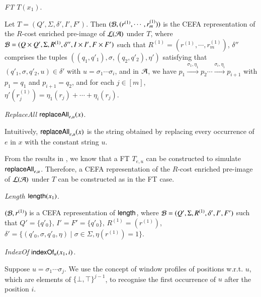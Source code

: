 \smallskip
\noindent \emph{FT $T(x_1)$}.

\smallskip

Let $T= (Q', \Sigma, \delta', I', F')$. Then $(\mathcal{B}, (r^{(1)}, \cdots, r^{(1)}_m))$ is the CEFA representation of the $R$-cost enriched pre-image of $\mathcal{L}(\mathcal{A})$ under $T$, where $ \mathcal{B}= (Q \times Q', \Sigma, R^{(1)}, \delta'', I \times I', F \times F')$ such that $R^{(1)}  = (r^{(1)}, \cdots, r^{(1)}_m)$, $\delta''$ comprises the tuples $((q_1, q'_1), \sigma, (q_2, q'_2), \eta')$ satisfying that $(q'_1, \sigma, q'_2, u) \in \delta'$ with $u = \sigma_1 \cdots \sigma_i$, and in $\mathcal{A}$, we have $p_1 \xrightarrow{\sigma_1, \eta_1} p_2 \cdots \xrightarrow{\sigma_i, \eta_i} p_{i+1}$ with $p_1 = q_1$ and $p_{i+1}= q_2$, and for each $j \in [m]$,  $\eta'(r^{(1)}_j) = \eta_1(r_j) + \cdots + \eta_i(r_j)$.
%

\smallskip 

\noindent \emph{ReplaceAll $\mathsf{replaceAll}_{e,u}(x)$}.

\smallskip

Intuitively, $\mathsf{replaceAll}_{e,u}(x)$ is the string obtained by replacing every occurrence of $e$ in $x$ with the constant string $u$.

From the results in \cite{CCH+18}, we know that  a FT $T_{e,u}$ can be constructed to simulate $\mathsf{replaceAll}_{e,u}$. 
Therefore, a CEFA representation of the $R$-cost enriched pre-image of $\mathcal{L}(\mathcal{A})$ under $T$ can be constructed as in the FT case.
% 

\smallskip 

\noindent \emph{Length $\mathsf{length}(x_1)$}.

\smallskip

$(\mathcal{B}, r^{(1)})$ is a CEFA representation of $\mathsf{length}$, where $\mathcal{B} = (Q', \Sigma, R^{(1)}, \delta', I', F')$ such that $Q' = \{q'_0\}$, $I'=F'=\{q'_0\}$, $R^{(1)} = (r^{(1)})$, $\delta' = \{(q'_0, \sigma, q'_0, \eta) \mid \sigma \in \Sigma, \eta(r^{(1)}) = 1\}$.

\smallskip 

\noindent \emph{IndexOf $\mathsf{indexOf}_u(x_1, i)$}.

\smallskip

Suppose $u = \sigma_1 \cdots \sigma_j$. We use the concept of window profiles of positions w.r.t. $u$, which are elements of $\{\bot, \top\}^{j-1}$, to recognise the first occurrence of $u$ after the position $i$. 

